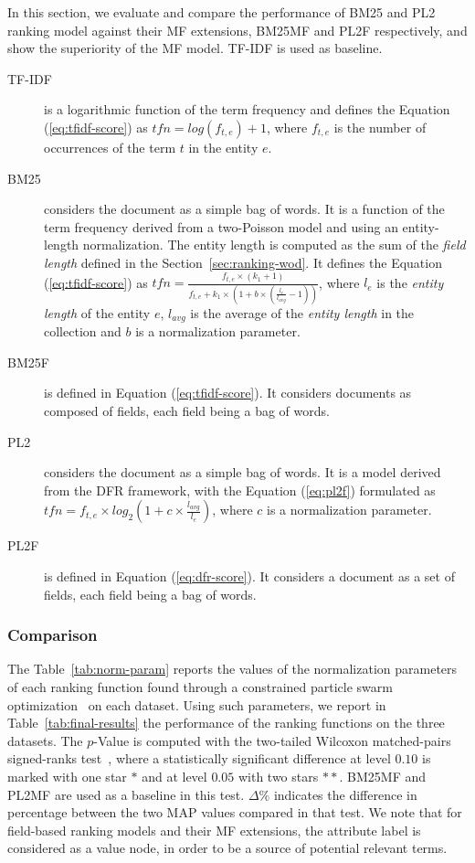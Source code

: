 In this section, we evaluate and compare the performance of BM25 and PL2 ranking model against their MF extensions, BM25MF and PL2F respectively, and show the superiority of the MF model. TF-IDF is used as baseline.

\begin{description}
  \item[TF-IDF] is a logarithmic function of the term frequency and defines the Equation (\ref{eq:tfidf-score}) as 
  $
  tfn=log(f_{t,e})+1
  $,
  where $f_{t,e}$ is the number of occurrences of the term $t$ in the entity $e$.
  \item[BM25~\cite{robertson:1994:sigir}] considers the document as a simple bag of words. It is a function of the term frequency derived from a two-Poisson model and using an entity-length normalization. The entity length is computed as the sum of the \emph{field length} defined in the Section~\ref{sec:ranking-wod}. It defines the Equation (\ref{eq:tfidf-score}) as 
  $
  tfn=\frac{f_{t,e}\times(k_1+1)}{f_{t,e}+k_1\times \left(1+b\times\left(\frac{l_e}{l_{avg}}-1\right)\right)}
  $,
where $l_e$ is the \emph{entity length} of the entity $e$, $l_{avg}$ is the average of the \emph{entity length} in the collection and $b$ is a normalization parameter.
  \item[BM25F] is defined in Equation (\ref{eq:tfidf-score}). It considers documents as composed of fields, each field being a bag of words.
  \item[PL2~\cite{amati:2002:acm}] considers the document as a simple bag of words. It is a model derived from the DFR framework, with the Equation (\ref{eq:pl2f}) formulated as 
  $
  tfn=f_{t,e}\times log_2\left(1+c\times\frac{l_{avg}}{l_e}\right)
  $,
  where $c$ is a normalization parameter.
  \item[PL2F] is defined in Equation (\ref{eq:dfr-score}). It considers a document as a set of fields, each field being a bag of words.
\end{description}

\subsubsection{Comparison}

The Table~\ref{tab:norm-param} reports the values of the normalization parameters of each ranking function found through a constrained particle swarm optimization~\cite{xiaohui:2002:sci} on each dataset. Using such parameters, we report in Table~\ref{tab:final-results} the performance of the ranking functions on the three datasets. The $p$-Value is computed with the two-tailed Wilcoxon matched-pairs signed-ranks test~\cite{sheskin:2003:CRC,buttcher:2010:IRI:1869919}, where a statistically significant difference at level $0.10$ is marked with one star $*$ and at level $0.05$ with two stars $**$. BM25MF and PL2MF are used as a baseline in this test. $\Delta\%$ indicates the difference in percentage between the two MAP values compared in that test.
We note that for field-based ranking models and their MF extensions, the attribute label is considered as a value node, in order to be a source of potential relevant terms.

